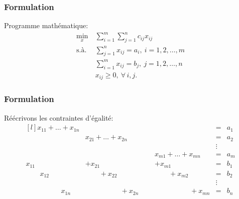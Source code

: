 \documentclass[usepdftitle=false, aspectratio=169]{beamer}
\begin{document}
\begin{frame}
\frametitle{Formulation}

Programme mathématique:
\begin{align*}
\min_x \ & \sum_{i = 1}^m \sum_{j = 1}^n c_{ij} x_{ij} \\
\mbox{s.à. } & \sum_{j = 1}^n x_{ij} = a_i, \ i = 1,2,\ldots,m \\
& \sum_{i = 1}^m x_{ij} = b_j,\ j = 1,2,\ldots,n \\
& x_{ij} \geq 0,\ \forall\, i, j.
\end{align*}

\end{frame}

\begin{frame}
\frametitle{Formulation}

Réécrivons les contraintes d'égalité:
\[
\begin{matrix}[l]
x_{11} + \ldots + x_{1n} & & & & = & a_1 \\
& x_{21} + \ldots + x_{2n} & & & = &  a_2 \\
& & & & \vdots \\
& & \mbox{ } & x_{m1} + \ldots + x_{mn} & = &  a_m \\
x_{11} & + x_{21} & & + x_{m1} & = & b_1 \\
\quad \quad x_{12} & \quad \quad + x_{22} & & \quad \quad + x_{m2} & = & b_2 \\
& & & & \vdots \\
\quad \quad \quad \qquad x_{1n} &  \quad \quad \quad \qquad +x_{2n} & &  \quad \quad \quad \qquad +x_{mn} & = & b_n 
\end{matrix}
\]

\end{frame}
\end{document}
